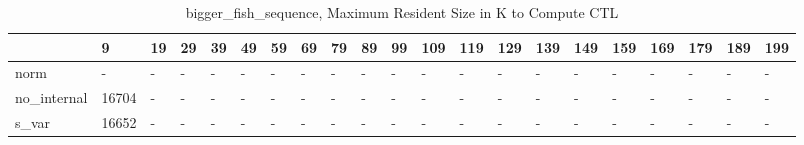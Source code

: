 \begin{table}
\caption{bigger_fish_sequence, Maximum Resident Size in K to Compute CTL}
\label{bigger_fish_sequence_CTL_size}
\begin{tabular}{lllllllllllllllllllll}
\toprule
 & 9 & 19 & 29 & 39 & 49 & 59 & 69 & 79 & 89 & 99 & 109 & 119 & 129 & 139 & 149 & 159 & 169 & 179 & 189 & 199 \\
\midrule
norm & - & - & - & - & - & - & - & - & - & - & - & - & - & - & - & - & - & - & - & - \\
no_internal & 16704 & - & - & - & - & - & - & - & - & - & - & - & - & - & - & - & - & - & - & - \\
s_var & 16652 & - & - & - & - & - & - & - & - & - & - & - & - & - & - & - & - & - & - & - \\
\bottomrule
\end{tabular}
\end{table}
